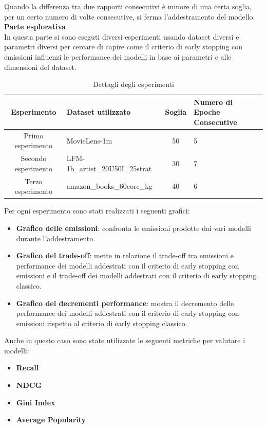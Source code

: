 \noindent Quando la differenza tra due rapporti consecutivi è minore di una certa soglia, per un certo numero di volte consecutive, si ferma l'addestramento del modello.\\
\noindent\textbf{Parte esplorativa}\\
In questa parte si sono eseguti diversi esperimenti usando dataset diversi e parametri diversi per cercare di capire come il criterio di early stopping con emissioni influenzi le performance dei modelli in base ai parametri e alle dimensioni del dataset.\\
\begin{table}[h!]
    \centering
    \begin{tabularx}{\textwidth}{|c|X|c|X|}
    \hline
    \textbf{Esperimento} & \textbf{Dataset utilizzato} & \textbf{Soglia} & \textbf{Numero di Epoche Consecutive} \\
    \hline
    Primo esperimento & MovieLens-1m & 50 & 5 \\
    \hline
    Secondo esperimento & LFM-1b\_artist\_20U50I\_25strat & 30 & 7 \\
    \hline
    Terzo esperimento & amazon\_books\_60core\_kg & 40 & 6 \\
    \hline
    \end{tabularx}
    \caption{Dettagli degli esperimenti}
    \end{table}

\noindent Per ogni esperimento sono stati realizzati i seguenti grafici:
\begin{itemize}
    \item \textbf{Grafico delle emissioni}: confronta le emissioni prodotte dai vari modelli durante l'addestramento.
    \item \textbf{Grafico del trade-off}: mette in relazione il trade-off tra emissioni e performance dei modelli addestrati con il criterio di early stopping con emissioni e il trade-off dei modelli addestrati con il criterio di early stopping classico.
    \item \textbf{Grafico del decrementi performance}: mostra il decremento delle performance dei modelli addestrati con il criterio di early stopping con emissioni rispetto al criterio di early stopping classico.
\end{itemize}

Anche in questo caso sono state utilizzate le seguenti metriche per valutare i modelli:
\begin{itemize}
    \item \textbf{Recall}
    \item \textbf{NDCG}
    \item \textbf{Gini Index}
    \item \textbf{Average Popularity}
\end{itemize}

